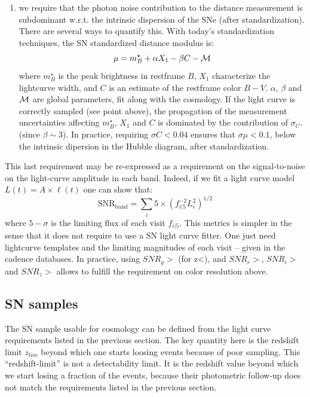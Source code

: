 \documentclass [11pt,a4paper]{article}
\begin{document}
\begin{enumerate}
\item we require that the photon noise contribution to the distance
  measurement is subdominant w.r.t. the intrinsic dispersion of the
  SNe (after standardization).  There are several ways to quantify
  this.  With today's standardization techniques, the SN standardized
  distance modulus is:
  \begin{equation}
    \mu = m^\star_B + \alpha X_1 - \beta C - \cal{M}
  \end{equation}
  where $m^\star_B$ is the peak brightness in restframe $B$, $X_1$
  characterize the lightcurve width, and $C$ is an estimate of the
  restframe color $B-V$. $\alpha$, $\beta$ and $\cal{M}$ are global
  parameters, fit along with the cosmology. If the light curve is
  correctly sampled (see point above), the propagation of the
  measurement uncertainties affecting $m^\star_B$, $X_1$ and $C$ is
  dominated by the contribution of $\sigma_C$. (since $\beta \sim
  3$). In practice, requiring $\sigma C < 0.04$ ensures that $\sigma
  \mu < 0.1$, below the intrinsic dipersion in the Hubble diagram,
  after standardization.
\end{enumerate}

This last requirement may be re-expressed as a requirement on the
signal-to-noise on the light-curve amplitude in each band. Indeed, if
we fit a light curve model $L(t) = A \times \ell(t)$ one can show
that:
$$
\mathrm{SNR_{band}} = \sum_{i} 5 \times (f^{-2}_{i|5} L_i^2)^{1/2}
$$
where $5-\sigma$ is the limiting flux of each visit $f_{i|5}$.
This metrics is simpler in the sense that it does not require to use a
SN light curve fitter. One just need lightcurve templates and the
limiting magnitudes of each visit -- given in the cadence
databases. In practice, using $SNR_g > $ (for z<), and $SNR_r > $,
$SNR_i > $ and $SNR_z > $ allows to fulfill the requirement on color
resolution above.


\subsection{SN samples}

The SN sample usable for cosmology can be defined from the light curve
requirements listed in the previous section. The key quantity here is
the redshift limit $z_{lim}$ beyond which one starts loosing events
because of poor sampling.  This ``redshift-limit'' is not a
detectability limit.  It is the redshift value beyond which we start
losing a fraction of the events, because their photometric follow-up
does not match the requirements listed in the previous section.
\end{document}
